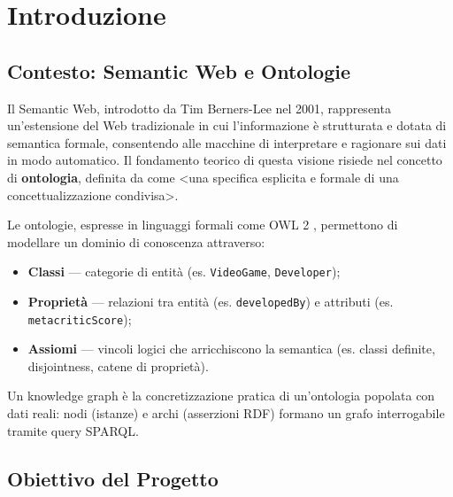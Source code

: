 \section{Introduzione}
\label{sec:introduzione}

\subsection{Contesto: Semantic Web e Ontologie}

Il Semantic Web, introdotto da Tim Berners-Lee nel 2001, rappresenta un'estensione
del Web tradizionale in cui l'informazione \`e strutturata e dotata di semantica
formale, consentendo alle macchine di interpretare e ragionare sui dati in modo
automatico. Il fondamento teorico di questa visione risiede nel concetto di
\textbf{ontologia}, definita da \citet{gruber1993} come \textless{}una specifica
esplicita e formale di una concettualizzazione condivisa\textgreater{}.

Le ontologie, espresse in linguaggi formali come OWL 2 \citep{w3c-owl2-primer},
permettono di modellare un dominio di conoscenza attraverso:
\begin{itemize}[nosep]
  \item \textbf{Classi} --- categorie di entit\`a (es. \texttt{VideoGame}, \texttt{Developer});
  \item \textbf{Propriet\`a} --- relazioni tra entit\`a (es. \texttt{developedBy}) e attributi (es. \texttt{metacriticScore});
  \item \textbf{Assiomi} --- vincoli logici che arricchiscono la semantica (es. classi definite, disjointness, catene di propriet\`a).
\end{itemize}

Un knowledge graph \`e la concretizzazione pratica di un'ontologia popolata con
dati reali: nodi (istanze) e archi (asserzioni RDF) formano un grafo interrogabile
tramite query SPARQL.

\subsection{Obiettivo del Progetto}

